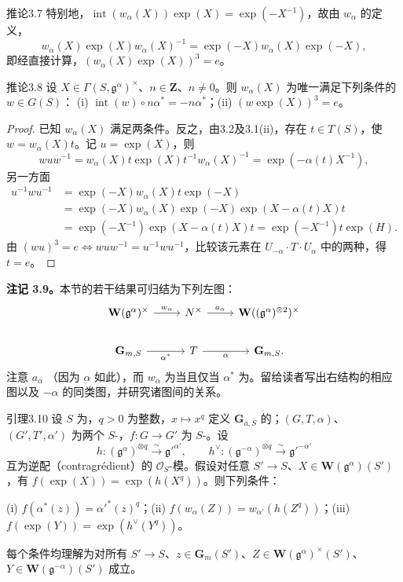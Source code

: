 \begin{SGAresult}{推论}{3.7}
特别地，$\operatorname{int}(w_\alpha(X))\exp(X)=\exp(-X^{-1})$，故由 $w_\alpha$ 的定义，
\[w_\alpha(X)\exp(X)w_\alpha(X)^{-1}=\exp(-X)w_\alpha(X)\exp(-X),\]
即经直接计算，$(w_\alpha(X)\exp(X))^3=e$。
\end{SGAresult}
\begin{SGAresult}{推论}{3.8}
设 $X\in\Gamma(S,\mathfrak g^\alpha)^\times$、$n\in\mathbf Z$、$n\ne0$。则 $w_\alpha(X)$ 为唯一满足下列条件的 $w\in G(S)$：
(i) $\operatorname{int}(w)\circ n\alpha^*=-n\alpha^*$；(ii) $(w\exp(X))^3=e$。
\end{SGAresult}
\begin{proof}
已知 $w_\alpha(X)$ 满足两条件。反之，由3.2及3.1(ii)，存在 $t\in T(S)$，使 $w=w_\alpha(X)t$。记 $u=\exp(X)$，则
\[wuw^{-1}=w_\alpha(X)t\exp(X)t^{-1}w_\alpha(X)^{-1}=\exp(-\alpha(t)X^{-1}),\]
另一方面
\[\begin{aligned}u^{-1}wu^{-1}&=\exp(-X)w_\alpha(X)t\exp(-X)\\&=\exp(-X)w_\alpha(X)\exp(-X)\exp(X-\alpha(t)X)t\\&=\exp(-X^{-1})\exp(X-\alpha(t)X)t=\exp(-X^{-1})t\exp(H).\end{aligned}\]
由 $(wu)^3=e\Longleftrightarrow wuw^{-1}=u^{-1}wu^{-1}$，比较该元素在 $U_{-\alpha}\cdot T\cdot U_\alpha$ 中的两种，得 $t=e$。
\end{proof}
\textbf{注记 3.9。}本节的若干结果可归结为下列左图：
\[\begin{tikzcd}\mathbf W(\mathfrak g^\alpha)^\times\arrow[r,"w_\alpha"]&N^\times\arrow[r,"a_\alpha"]&\mathbf W((\mathfrak g^\alpha)^{\otimes2})^\times\\\mathbf G_{m,S}\arrow[r,"\alpha^*"']&T\arrow[r,"\alpha"']&\mathbf G_{m,S}.\end{tikzcd}\]
注意 $a_\alpha$ （因为 $\alpha$ 如此），而 $w_\alpha$ 为当且仅当 $\alpha^*$ 为。留给读者写出右结构的相应图以及 $-\alpha$ 的同类图，并研究诸图间的关系。
\begin{SGAresult}{引理}{3.10}
设 $S$ 为，$q>0$ 为整数，$x\mapsto x^q$ 定义 $\mathbf G_{a,S}$ 的；$(G,T,\alpha)$、$(G',T',\alpha')$ 为两个 $S$-，$f:G\to G'$ 为 $S$-。设
\[h:(\mathfrak g^\alpha)^{\otimes q}\xrightarrow\sim\mathfrak g'^{\alpha'},\qquad h^\vee:(\mathfrak g^{-\alpha})^{\otimes q}\xrightarrow\sim\mathfrak g'^{-\alpha'}\]
互为逆配（contragrédient）的 $\mathscr O_S$-模。假设对任意 $S'\to S$、$X\in\mathbf W(\mathfrak g^\alpha)(S')$，有 $f(\exp(X))=\exp(h(X^q))$。则下列条件：

(i) $f(\alpha^*(z))=\alpha'^*(z)^q$；(ii) $f(w_\alpha(Z))=w_{\alpha'}(h(Z^q))$；(iii) $f(\exp(Y))=\exp(h^\vee(Y^q))$。

每个条件均理解为对所有 $S'\to S$、$z\in\mathbf G_m(S')$、$Z\in\mathbf W(\mathfrak g^\alpha)^\times(S')$、$Y\in\mathbf W(\mathfrak g^{-\alpha})(S')$ 成立。
\end{SGAresult}
